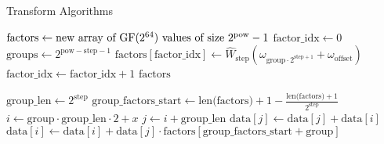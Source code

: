 \begin{algorithm}
    \caption{Transform Algorithms}
    \begin{algorithmic}
            \State $\text{factors} \gets \text{new array of $\text{GF}(2^{64})$ values of size } 2^{\text{pow}} - 1$
            \State $\text{factor\_idx} \gets 0$
                \State $\text{groups} \gets 2^{\text{pow} - \text{step} - 1}$
                    \State $\text{factors}[\text{factor\_idx}] \gets \hat{W}_{\text{step}}(\omega_{\text{group} \cdot 2^{\text{step} + 1}} + \omega_{\text{offset}})$
                    \State $\text{factor\_idx} \gets \text{factor\_idx} + 1$
                \EndFor
            \EndFor
            \State \Return $\text{factors}$
        \EndFunction
    \end{algorithmic}

    \begin{algorithmic}
                \State $\text{group\_len} \gets 2^{\text{step}}$
                \State $\text{group\_factors\_start} \gets \text{len(factors)} + 1 - \frac{\text{len(factors)} + 1}{2^{\text{step}}}$
                        \State $i \gets \text{group} \cdot \text{group\_len} \cdot 2 + x$
                        \State $j \gets i + \text{group\_len}$
                        \State $\text{data}[j] \gets \text{data}[j] + \text{data}[i]$
                        \State $\text{data}[i] \gets \text{data}[i] + \text{data}[j] \cdot \text{factors}[\text{group\_factors\_start} + \text{group}]$
                    \EndFor
                \EndFor
            \EndFor
        \EndFunction
    \end{algorithmic}


\end{algorithm}
